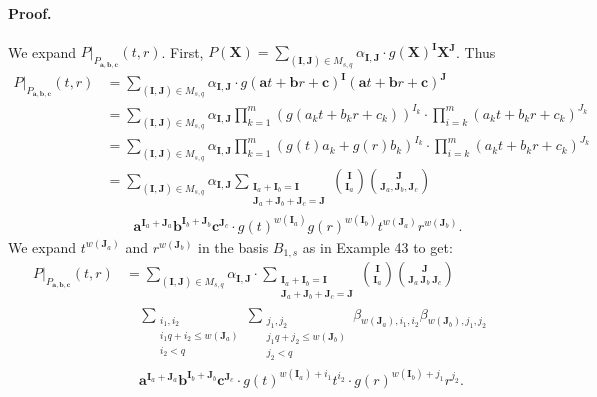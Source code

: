 \paragraph{Proof.} We expand $P|_{P_{\boldsymbol a,\boldsymbol b,\boldsymbol c}}(t,r)$. First, $P(\boldsymbol X)=\sum_{(\boldsymbol I,\boldsymbol J)\in M_{s,q}}\alpha_{\boldsymbol I,\boldsymbol J}\cdot g(\boldsymbol X)^{\boldsymbol I}\boldsymbol X^{\boldsymbol J}$. Thus
\begin{align*}
P|_{P_{\boldsymbol a,\boldsymbol b,\boldsymbol c}}(t,r)
&=\sum_{(\boldsymbol I,\boldsymbol J)\in M_{s,q}}\alpha_{\boldsymbol I,\boldsymbol J}\cdot g(\boldsymbol at+\boldsymbol br+\boldsymbol c)^{\boldsymbol I}(\boldsymbol at+\boldsymbol br+\boldsymbol c)^{\boldsymbol J}\\
&=\sum_{(\boldsymbol I,\boldsymbol J)\in M_{s,q}}\alpha_{\boldsymbol I,\boldsymbol J}\prod_{k=1}^m(g(a_kt+b_kr+c_k))^{I_k}\cdot\prod_{i=k}^m(a_kt+b_kr+c_k)^{J_k}\\
&=\sum_{(\boldsymbol I,\boldsymbol J)\in M_{s,q}}\alpha_{\boldsymbol I,\boldsymbol J}\prod_{k=1}^m(g(t)a_k+g(r)b_k)^{I_k}\cdot\prod_{i=k}^m(a_kt+b_kr+c_k)^{J_k}\\
&=\sum_{(\boldsymbol I,\boldsymbol J)\in M_{s,q}}\alpha_{\boldsymbol I,\boldsymbol J}\sum_{\substack{\boldsymbol I_a+\boldsymbol I_b=\boldsymbol I\\\boldsymbol J_a+\boldsymbol J_b+\boldsymbol J_c=\boldsymbol J}}\binom{\boldsymbol I}{\boldsymbol I_a}\binom{\boldsymbol J}{\boldsymbol J_a,\boldsymbol J_b,\boldsymbol J_c}\\
&\qquad\boldsymbol a^{\boldsymbol I_a+\boldsymbol J_a}\boldsymbol b^{\boldsymbol I_b+\boldsymbol J_b}\boldsymbol c^{\boldsymbol J_c}\cdot g(t)^{w(\boldsymbol I_a)}g(r)^{w(\boldsymbol I_b)}t^{w(\boldsymbol J_a)}r^{w(\boldsymbol J_b)}.\tag{14}
\end{align*}
We expand $t^{w(\boldsymbol J_a)}$ and $r^{w(\boldsymbol J_b)}$ in the basis $B_{1,s}$ as in Example 43 to get:
\begin{align*}
P|_{P_{\boldsymbol a,\boldsymbol b,\boldsymbol c}}(t,r)
&=\sum_{(\boldsymbol I,\boldsymbol J)\in M_{s,q}}\alpha_{\boldsymbol I,\boldsymbol J}\cdot\sum_{\substack{\boldsymbol I_a+\boldsymbol I_b=\boldsymbol I\\\boldsymbol J_a+\boldsymbol J_b+\boldsymbol J_c=\boldsymbol J}}\binom{\boldsymbol I}{\boldsymbol I_a}\binom{\boldsymbol J}{\boldsymbol J_a\ \boldsymbol J_b\ \boldsymbol J_c}\\
&\quad\sum_{\substack{i_1,i_2\\i_1q+i_2\leq w(\boldsymbol J_a)\\i_2<q}}\sum_{\substack{j_1,j_2\\j_1q+j_2\leq w(\boldsymbol J_b)\\j_2<q}}\beta_{w(\boldsymbol J_a),i_1,i_2}\beta_{w(\boldsymbol J_b),j_1,j_2}\\
&\quad\boldsymbol a^{\boldsymbol I_a+\boldsymbol J_a}\boldsymbol b^{\boldsymbol I_b+\boldsymbol J_b}\boldsymbol c^{\boldsymbol J_c}\cdot g(t)^{w(\boldsymbol I_a)+i_1}t^{i_2}\cdot g(r)^{w(\boldsymbol I_b)+j_1}r^{j_2}.\tag{15}
\end{align*}
